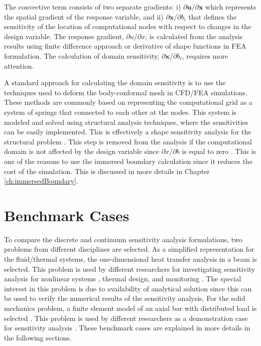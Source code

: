 The convective term consists of two separate gradients: i) $\partial \mathbf{u} / \partial \mathbf{x}$ which represents the spatial gradient of the response variable, and ii) $\partial \mathbf{x} / \partial b_i$ that defines the sensitivity of the location of computational nodes with respect to changes in the design variable. The response gradient, $\partial u/\partial x$, is calculated from the analysis results using finite difference approach or derivative of shape functions in FEA formulation. The calculation of domain sensitivity, $\partial \mathbf{x} / \partial b_i$, requires more attention.

A standard approach for calculating the domain sensitivity is to use the techniques used to deform the body-conformal mesh in CFD/FEA simulations. These methods are commonly based on representing the computational grid as a system of springs that connected to each other at the nodes. This system is modeled and solved using structural analysis techniques, where the sensitivities can be easily implemented. This is effectively a shape sensitivity analysis for the structural problem \cite{haftka1986structural}. This step is removed from the analysis if the computational domain is not affected by the design variable since $\partial x/\partial b$ is equal to zero \cite{gobal2014continuum}. This is one of the reasons to use the immersed boundary calculation since it reduces the cost of the simulation. This is discussed in more details in Chapter \ref{ch:immersedBoundary}.

\section{Benchmark Cases}
To compare the discrete and continuum sensitivity analysis formulations, two problems from different disciplines are selected. As a simplified representation for the fluid/thermal systems, the one-dimensional heat transfer analysis in a beam is selected. This problem is used by different researchers for investigating sensitivity analysis for nonlinear systems \cite{dowding2001sensitivity}, thermal design, and monitoring \cite{szopa2005second, sorli2004computational}. The special interest in this problem is due to availability of analytical solution since this can be used to verify the numerical results of the sensitivity analysis. For the solid mechanics problem, a finite element model of an axial bar with distributed load is selected \cite{szabo1991finite}. This problem is used by different researchers as a demonstration case for sensitivity analysis \cite{cross2014local, wickert2009least}. These benchmark cases are explained in more details in the following sections.

